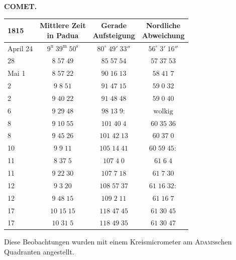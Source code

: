 \clearpage
\thispagestyle{empty}
\noindent{}%
%
\parbox[t]{\dimexpr\linewidth-24mm\relax}{\centering\footnotesize\bfseries COMET.\par}%
\makebox[12mm][r]{}\par\nobreak\medskip
\begin{center}\fontsize{10}{12}\selectfont\setlength{\tabcolsep}{5pt}\renewcommand{\arraystretch}{1.15}\begin{tabular}{l|c|c|c}
1815 & \shortstack{Mittlere Zeit\\in Padua} & \shortstack{Gerade\\Aufsteigung} & \shortstack{Nordliche\\Abweichung}\\\hline
April 24 & $9^{\mathrm u}\;39^{\mathrm m}\;50^{\mathrm s}$ & $80^\circ\;49'\;33''$ & $56^\circ\;3'\;16''$\\
28 & $8\;57\;49$ & $85\;57\;54$ & $57\;37\;53$\\
Mai 1 & $8\;57\;22$ & $90\;16\;13$ & $58\;41\;7$\\
2 & $9\;8\;51$ & $91\;47\;15$ & $59\;0\;32$\\
2 & $9\;40\;22$ & $91\;48\;48$ & $59\;0\;40$\\
6 & $9\;29\;48$ & $98\;13\;9:$ & $\text{wolkig}$\\
8 & $9\;10\;55$ & $101\;40\;4$ & $60\;35\;36$\\
8 & $9\;45\;26$ & $101\;42\;13$ & $60\;37\;0$\\
10 & $9\;9\;11$ & $105\;14\;41$ & $60\;59\;45:$\\
11 & $8\;37\;5$ & $107\;4\;0$ & $61\;6\;4$\\
11 & $9\;22\;30$ & $107\;7\;18$ & $61\;7\;30$\\
12 & $9\;3\;20$ & $108\;57\;37$ & $61\;16\;32:$\\
12 & $9\;48\;15$ & $109\;2\;11$ & $61\;16\;7$\\
17 & $10\;15\;15$ & $118\;47\;45$ & $61\;30\;45$\\
17 & $10\;31\;5$ & $118\;49\;35$ & $61\;30\;47$\\
\end{tabular}\end{center}

\par\indent Diese Beobachtungen wurden mit einem Kreismicrometer am \textsc{Adams}schen Quadranten angestellt.

